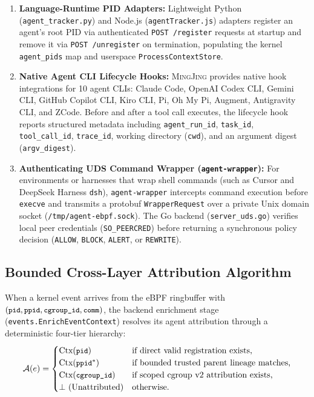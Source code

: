 \documentclass[10pt,twocolumn,letterpaper]{article}
\newcommand{\sys}{\textsc{MingJing}}
\newcommand{\code}[1]{\texttt{\small #1}}
\begin{document}
\begin{enumerate}
  \item \textbf{Language-Runtime PID Adapters:} Lightweight Python (\code{agent\_tracker.py}) and Node.js (\code{agentTracker.js}) adapters register an agent's root PID via authenticated \code{POST /register} requests at startup and remove it via \code{POST /unregister} on termination, populating the kernel \code{agent\_pids} map and userspace \code{ProcessContextStore}.
  \item \textbf{Native Agent CLI Lifecycle Hooks:} \sys{} provides native hook integrations for 10 agent CLIs: Claude Code, OpenAI Codex CLI, Gemini CLI, GitHub Copilot CLI, Kiro CLI, Pi, Oh My Pi, Augment, Antigravity CLI, and ZCode. Before and after a tool call executes, the lifecycle hook reports structured metadata including \code{agent\_run\_id}, \code{task\_id}, \code{tool\_call\_id}, \code{trace\_id}, working directory (\code{cwd}), and an argument digest (\code{argv\_digest}).
  \item \textbf{Authenticating UDS Command Wrapper (\code{agent-wrapper}):} For environments or harnesses that wrap shell commands (such as Cursor and DeepSeek Harness \code{dsh}), \code{agent-wrapper} intercepts command execution before \code{execve} and transmits a protobuf \code{WrapperRequest} over a private Unix domain socket (\code{/tmp/agent-ebpf.sock}). The Go backend (\code{server\_uds.go}) verifies local peer credentials (\code{SO\_PEERCRED}) before returning a synchronous policy decision (\code{ALLOW}, \code{BLOCK}, \code{ALERT}, or \code{REWRITE}).
\end{enumerate}

\subsection{Bounded Cross-Layer Attribution Algorithm}
When a kernel event arrives from the eBPF ringbuffer with $(\code{pid}, \code{ppid}, \code{cgroup\_id}, \code{comm})$, the backend enrichment stage (\code{events.EnrichEventContext}) resolves its agent attribution through a deterministic four-tier hierarchy:
\begin{equation}
  \mathcal{A}(e) = \begin{cases}
    \text{Ctx}(\code{pid}) & \text{if direct valid registration exists,} \\
    \text{Ctx}(\code{ppid}^{*}) & \text{if bounded trusted parent lineage matches,} \\
    \text{Ctx}(\code{cgroup\_id}) & \text{if scoped cgroup v2 attribution exists,} \\
    \bot~(\text{Unattributed}) & \text{otherwise.}
  \end{cases}
\end{equation}
\end{document}
